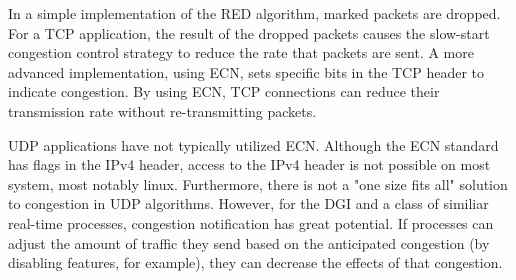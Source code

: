 In a simple implementation of the RED algorithm, marked packets are dropped.
For a TCP application, the result of the dropped packets causes the slow-start congestion control strategy to reduce the rate that packets are sent.
A more advanced implementation, using ECN, sets specific bits in the TCP header to indicate congestion.
By using ECN, TCP connections can reduce their transmission rate without re-transmitting packets.

UDP applications have not typically utilized ECN.
Although the ECN standard has flags in the IPv4 header, access to the IPv4 header is not possible on most system, most notably linux.
Furthermore, there is not a "one size fits all" solution to congestion in UDP algorithms.
However, for the DGI and a class of similiar real-time processes, congestion notification has great potential.
If processes can adjust the amount of traffic they send based on the anticipated congestion (by disabling features, for example), they can decrease the effects of that congestion.

